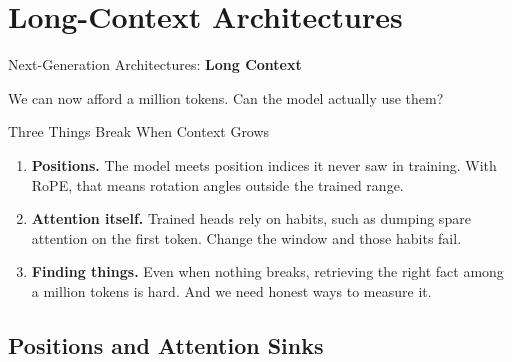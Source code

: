 \section{Long-Context Architectures}

\begin{frame}{}
    \LARGE Next-Generation Architectures: \textbf{Long Context}

    \vspace{1em}
    \normalsize We can now afford a million tokens. Can the model actually use them?
\end{frame}

\begin{frame}{Three Things Break When Context Grows}
    \begin{enumerate}\itemsep0.8em
        \item \textbf{Positions.} The model meets position indices it never saw in training. With RoPE, that means rotation angles outside the trained range.
        \item \textbf{Attention itself.} Trained heads rely on habits, such as dumping spare attention on the first token. Change the window and those habits fail.
        \item \textbf{Finding things.} Even when nothing breaks, retrieving the right fact among a million tokens is hard. And we need honest ways to measure it.
    \end{enumerate}
    \vspace{0.8em}
\end{frame}

\subsection{Positions and Attention Sinks}

